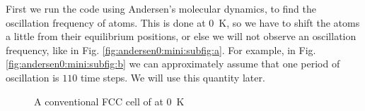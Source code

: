 First we run the code using Andersen's molecular dynamics, to find the oscillation frequency of atoms. This is done at \SI{0}{\kelvin}, so we have to shift the atoms a little from their equilibrium
positions, or else we will not observe an oscillation frequency, like in Fig. \ref{fig:andersen0:mini:subfig:a}.
For example, in Fig. \ref{fig:andersen0:mini:subfig:b} we can approximately assume that
one period of oscillation is $110$ time steps. We will use this quantity later.
\begin{figure}[h]
  \hfill
  \caption{A conventional FCC cell of  at \SI{0}{\kelvin}}
  \label{fig:andersen0}   %
\end{figure}


